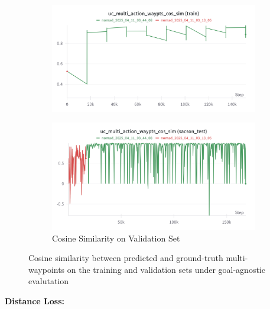 \documentclass[12pt]{article}
\begin{document}
\begin{figure}[H]
    \centering
    \begin{subfigure}[b]{0.48\textwidth}
        \centering
        \includegraphics[width=\textwidth]{images/cs_multi_action_cos_train.png}
        \label{fig:uc_multi_action_waypts_cos_sim}
    \end{subfigure}
    \hfill
    \begin{subfigure}[b]{0.48\textwidth}
        \centering
        \includegraphics[width=\textwidth]{images/uc_multi_action_sim_test.png}
        \caption{Cosine Similarity on Validation Set}
        \label{fig:uc_action_multi_waypts_cos_sim_test}
    \end{subfigure}
    \caption{Cosine similarity between predicted and ground-truth multi-waypoints on the training and validation sets under goal-agnostic evalutation}
\end{figure}
\bigskip
\noindent \textbf{Distance Loss:}\\
\end{document}
